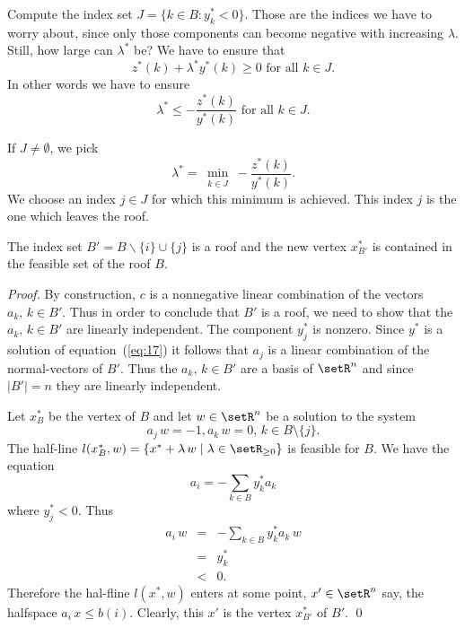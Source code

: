 Compute   the index set $J  = \{ k \in B \colon y^*_k <0\}$.  Those are the 
indices we have to worry about, since only those components 
 can become negative with increasing $\lambda$. Still, how large can
$\lambda^*$ be? We have to ensure that
\begin{equation}
  \label{eq:8}
  z^*(k) +\lambda^* y^*(k) \geq0 \text{ for all } k \in J.
\end{equation}
In other words we have to ensure 
\begin{equation}
  \label{eq:4}
  \lambda^* \leq - \frac{z^*(k)}{y^*(k)} \text{ for all }  k\in J.
\end{equation}



{ If $J \neq \emptyset$, }
we pick 
 \begin{equation}
   \label{eq:9}
   \lambda^* = \min_{\substack{k\in J}}  - \frac{z^*(k)}{y^*(k)}. 
\end{equation}
We choose an index  $j \in J$ for which this minimum is achieved. 
This  index $j$ is the
one which leaves the roof. 

\begin{lemma}
  \label{lem:1}
  The index set $B'=B \backslash \{i\} \cup \{j\}$ is a roof and the new vertex
  $x^*_{B'}$ is contained in the feasible set of the roof $B$. 
\end{lemma}
\begin{proof}
  By construction,  $c$ is a nonnegative linear combination of
  the  vectors $a_k, \, k \in B'$.  Thus in order to conclude that $B'$
  is a roof, we  need to show that the 
  $a_k, \, k \in B' $ are linearly independent. The component 
  $y^*_j$ is nonzero. Since $y^*$ is a solution of
  equation~(\ref{eq:17}) it follows that $a_j$ is a linear combination
  of the normal-vectors of $B'$. Thus the $a_k, \, k \in B'$ are a
  basis of $\setR^n$ and since $|B'|=n$ they are linearly independent. 


  Let $x_B^*$ be the vertex of $B$ and let $w \in \setR^n$ be a solution to
  the system 
  \begin{equation}
    \label{eq:15}
    a_j\,w = -1, a_k\,w=0, \, k \in B\setminus\{j\}. 
  \end{equation}
  The half-line  $l(x_B^*,w) = \{ x^* + \lambda \, w \mid \lambda \in \setR_{\geq0}\}$  is feasible
  for $B$. We have the equation
  \begin{equation}
    \label{eq:16}
    a_i = -\sum_{k \in B} y^*_k a_k
  \end{equation}
  where $y^*_j < 0$.  Thus 
  \begin{eqnarray}
    a_i\, w  & = & - \sum_{k \in B} y^*_k a_k\, w \\
          & = &  y^*_k \\
          & < & 0.
  \end{eqnarray}
  Therefore the hal-fline  $l(x^*,w)$ enters at some point,  $x' \in \setR^n$ say, the
  halfspace $a_i\,x\leq b(i)$. Clearly, this $x'$  is the vertex $x^*_{B'}$ of $B'$. \qed
\end{proof}

